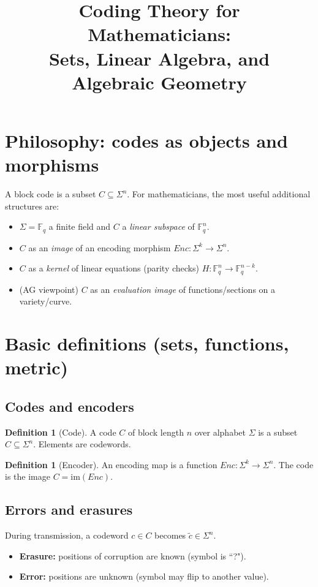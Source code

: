 \documentclass[11pt]{article}
\title{Coding Theory for Mathematicians:\\
	Sets, Linear Algebra, and Algebraic Geometry}
\author{}
\date{}
\theoremstyle{definition}
\newtheorem{definition}[theorem]{Definition}
\theoremstyle{remark}
\newcommand{\F}{\mathbb{F}}
\begin{document}
	\maketitle
	\tableofcontents
	
	\section{Philosophy: codes as objects and morphisms}
	A block code is a subset \(C \subseteq \Sigma^n\). For mathematicians, the most useful additional structures are:
	\begin{itemize}
		\item \(\Sigma=\F_q\) a finite field and \(C\) a \emph{linear subspace} of \(\F_q^n\).
		\item \(C\) as an \emph{image} of an encoding morphism \(Enc:\Sigma^k\to \Sigma^n\).
		\item \(C\) as a \emph{kernel} of linear equations (parity checks) \(H:\F_q^n\to \F_q^{n-k}\).
		\item (AG viewpoint) \(C\) as an \emph{evaluation image} of functions/sections on a variety/curve.
	\end{itemize}
	
	\section{Basic definitions (sets, functions, metric)}
	\subsection{Codes and encoders}
	\begin{definition}[Code]
		A code \(C\) of block length \(n\) over alphabet \(\Sigma\) is a subset \(C\subseteq \Sigma^n\).
		Elements are codewords.
	\end{definition}
	
	\begin{definition}[Encoder]
		An encoding map is a function \(Enc:\Sigma^k\to \Sigma^n\).
		The code is the image \(C=\mathrm{im}(Enc)\).
	\end{definition}
	
	\subsection{Errors and erasures}
	During transmission, a codeword \(c\in C\) becomes \(\tilde c\in \Sigma^n\).
	\begin{itemize}
		\item \textbf{Erasure:} positions of corruption are known (symbol is ``?").
		\item \textbf{Error:} positions are unknown (symbol may flip to another value).
	\end{itemize}
	
\end{document}
